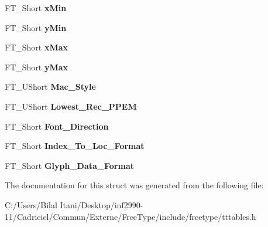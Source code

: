 \begin{DoxyCompactItemize}
\item 
F\+T\+\_\+\+Short {\bfseries x\+Min}\hypertarget{struct_t_t___header___ae4553d76427d9f7a28595ed71897dcbb}{}\label{struct_t_t___header___ae4553d76427d9f7a28595ed71897dcbb}

\item 
F\+T\+\_\+\+Short {\bfseries y\+Min}\hypertarget{struct_t_t___header___ac6aad4966bac8a96c5bc48765b3d694a}{}\label{struct_t_t___header___ac6aad4966bac8a96c5bc48765b3d694a}

\item 
F\+T\+\_\+\+Short {\bfseries x\+Max}\hypertarget{struct_t_t___header___a593b9cc3e11532972a7fc96944dd1ae9}{}\label{struct_t_t___header___a593b9cc3e11532972a7fc96944dd1ae9}

\item 
F\+T\+\_\+\+Short {\bfseries y\+Max}\hypertarget{struct_t_t___header___a02d236cd8150c00e886a0c487c04dffa}{}\label{struct_t_t___header___a02d236cd8150c00e886a0c487c04dffa}

\item 
F\+T\+\_\+\+U\+Short {\bfseries Mac\+\_\+\+Style}\hypertarget{struct_t_t___header___a82f2a5a836b802e44ff712b3afc8745c}{}\label{struct_t_t___header___a82f2a5a836b802e44ff712b3afc8745c}

\item 
F\+T\+\_\+\+U\+Short {\bfseries Lowest\+\_\+\+Rec\+\_\+\+P\+P\+EM}\hypertarget{struct_t_t___header___a1d20801c3482dee2529d294441ed9af3}{}\label{struct_t_t___header___a1d20801c3482dee2529d294441ed9af3}

\item 
F\+T\+\_\+\+Short {\bfseries Font\+\_\+\+Direction}\hypertarget{struct_t_t___header___a1cb7d8a2a76ae1acda3ac94bcd555954}{}\label{struct_t_t___header___a1cb7d8a2a76ae1acda3ac94bcd555954}

\item 
F\+T\+\_\+\+Short {\bfseries Index\+\_\+\+To\+\_\+\+Loc\+\_\+\+Format}\hypertarget{struct_t_t___header___a05a488607bfae319de096b4bd9cf8c6d}{}\label{struct_t_t___header___a05a488607bfae319de096b4bd9cf8c6d}

\item 
F\+T\+\_\+\+Short {\bfseries Glyph\+\_\+\+Data\+\_\+\+Format}\hypertarget{struct_t_t___header___adeeedce4bb708c3e068ed80366ec921d}{}\label{struct_t_t___header___adeeedce4bb708c3e068ed80366ec921d}

\end{DoxyCompactItemize}


The documentation for this struct was generated from the following file\+:\begin{DoxyCompactItemize}
\item 
C\+:/\+Users/\+Bilal Itani/\+Desktop/inf2990-\/11/\+Cadriciel/\+Commun/\+Externe/\+Free\+Type/include/freetype/tttables.\+h\end{DoxyCompactItemize}
